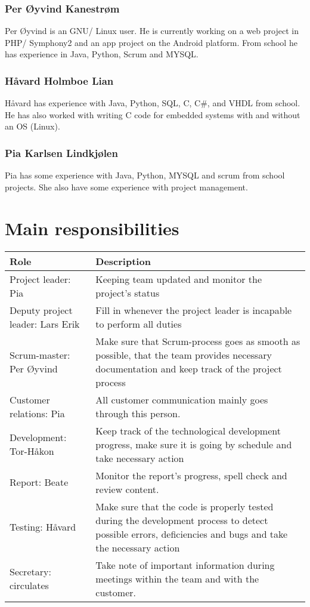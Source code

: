 \subsubsection{Per Øyvind Kanestrøm}
Per Øyvind is an GNU/ Linux user. He is currently working on a web project in PHP/ Symphony2 and an app project on the Android platform. From school he has experience in Java, Python, Scrum and MYSQL.

\subsubsection{Håvard	Holmboe	Lian}
Håvard has experience with Java, Python, SQL, C, C\#, and VHDL from school. He has also worked with writing C code for embedded systems with and without an OS (Linux). 

\subsubsection{Pia	Karlsen	Lindkjølen}
Pia has some experience with Java, Python, MYSQL and scrum from school projects. She also have some experience with project management. 

\section{Main responsibilities}
\begin{table}[H]
\begin{tabular}{l|p{7cm}}
\textbf{Role} & \textbf{Description}\\\hline
Project leader: Pia & Keeping team updated and monitor the project's status\\\hline
Deputy project leader: Lars Erik & Fill in whenever the project leader is incapable to perform all duties\\\hline
Scrum-master: Per Øyvind & Make sure that Scrum-process goes as smooth as possible, that the team provides necessary documentation and keep track of the project process\\\hline
Customer relations: Pia & All customer communication mainly goes through this person.\\\hline
Development: Tor-Håkon & Keep track of the technological development progress, make sure it is going by schedule and take necessary action \\\hline
Report: Beate & Monitor the report's progress, spell check and review content.\\\hline
Testing: Håvard & Make sure that the code is properly tested during the development process to detect possible errors, deficiencies and bugs and take the necessary action \\\hline
Secretary: circulates & Take note of important information during meetings within the team and with the customer.
\end{tabular}
\end{table}

